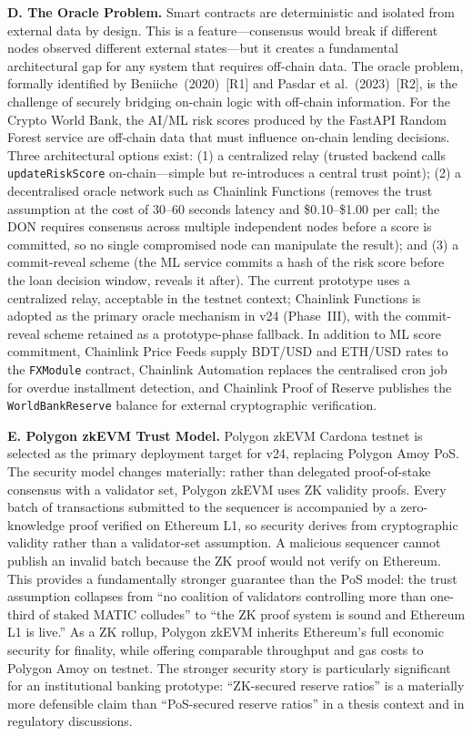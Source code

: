 \documentclass[12pt,a4paper]{report}
\begin{document}
\textbf{D. The Oracle Problem.}
Smart contracts are deterministic and isolated from external data by design. This is a feature---consensus would break if different nodes observed different external states---but it creates a fundamental architectural gap for any system that requires off-chain data. The oracle problem, formally identified by Beniiche~(2020)~[R1] and Pasdar et al.~(2023)~[R2], is the challenge of securely bridging on-chain logic with off-chain information. For the Crypto World Bank, the AI/ML risk scores produced by the FastAPI Random Forest service are off-chain data that must influence on-chain lending decisions. Three architectural options exist: (1) a centralized relay (trusted backend calls \texttt{updateRiskScore} on-chain---simple but re-introduces a central trust point); (2) a decentralised oracle network such as Chainlink Functions (removes the trust assumption at the cost of 30--60 seconds latency and \$0.10--\$1.00 per call; the DON requires consensus across multiple independent nodes before a score is committed, so no single compromised node can manipulate the result); and (3) a commit-reveal scheme (the ML service commits a hash of the risk score before the loan decision window, reveals it after). The current prototype uses a centralized relay, acceptable in the testnet context; Chainlink Functions is adopted as the primary oracle mechanism in v24 (Phase~III), with the commit-reveal scheme retained as a prototype-phase fallback. In addition to ML score commitment, Chainlink Price Feeds supply BDT/USD and ETH/USD rates to the \texttt{FXModule} contract, Chainlink Automation replaces the centralised cron job for overdue installment detection, and Chainlink Proof of Reserve publishes the \texttt{WorldBankReserve} balance for external cryptographic verification.

\textbf{E. Polygon zkEVM Trust Model.}
Polygon zkEVM Cardona testnet is selected as the primary deployment target for v24, replacing Polygon Amoy PoS. The security model changes materially: rather than delegated proof-of-stake consensus with a validator set, Polygon zkEVM uses ZK validity proofs. Every batch of transactions submitted to the sequencer is accompanied by a zero-knowledge proof verified on Ethereum L1, so security derives from cryptographic validity rather than a validator-set assumption. A malicious sequencer cannot publish an invalid batch because the ZK proof would not verify on Ethereum. This provides a fundamentally stronger guarantee than the PoS model: the trust assumption collapses from ``no coalition of validators controlling more than one-third of staked MATIC colludes'' to ``the ZK proof system is sound and Ethereum L1 is live.'' As a ZK rollup, Polygon zkEVM inherits Ethereum's full economic security for finality, while offering comparable throughput and gas costs to Polygon Amoy on testnet. The stronger security story is particularly significant for an institutional banking prototype: ``ZK-secured reserve ratios'' is a materially more defensible claim than ``PoS-secured reserve ratios'' in a thesis context and in regulatory discussions.
\end{document}
